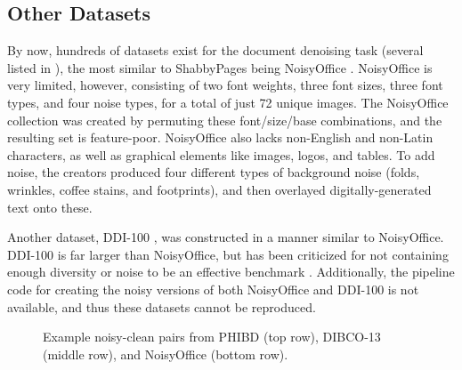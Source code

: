 \documentclass[runningheads]{llncs}
\begin{document}
\subsection{Other Datasets}
By now, hundreds of datasets exist for the document denoising task (several listed in \cite{tab:datasets}), the most similar to ShabbyPages being NoisyOffice \cite{ref_NoisyOfficeDatabase}.
NoisyOffice is very limited, however, consisting of two font weights, three font sizes, three font types, and four noise types, for a total of just 72 unique images.
The NoisyOffice collection was created by permuting these font/size/base combinations, and the resulting set is feature-poor.
NoisyOffice also lacks non-English and non-Latin characters, as well as graphical elements like images, logos, and tables.
To add noise, the creators produced four different types of background noise (folds, wrinkles, coffee stains, and footprints), and then overlayed digitally-generated text onto these.

Another dataset, DDI-100 \cite{ddi-100-2019}, was constructed in a manner similar to NoisyOffice.
DDI-100 is far larger than NoisyOffice, but has been criticized for not containing enough diversity or noise to be an effective benchmark \cite{detection-masking-2022}.
Additionally, the pipeline code for creating the noisy versions of both NoisyOffice and DDI-100 is not available, and thus these datasets cannot be reproduced.

\begin{figure}
    \centering{}
    \caption{Example noisy-clean pairs from PHIBD (top row), DIBCO-13 (middle row), and NoisyOffice (bottom row).}
    \label{fig:other-dataset-examples}
\end{figure}
\end{document}
